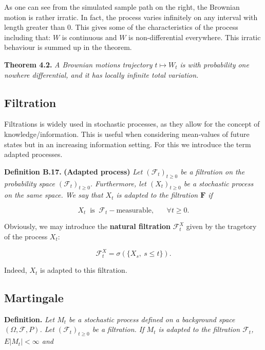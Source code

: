 \documentclass[
]{article}
\begin{document}
As one can see from the simulated sample path on the right, the Brownian
motion is rather irratic. In fact, the process varies infinitely on any
interval with length greater than 0. This gives some of the
characteristics of the process including that: \(W\) is continuous and
\(W\) is non-differential everywhere. This irratic behaviour is summed
up in the theorem.

\textbf{Theorem 4.2.} \emph{A Brownian motions trajectory
\(t\mapsto W_t\) is with probability one nowhere differential, and it
has locally infinite total variation.}

\hypertarget{filtration}{%
\subsection{Filtration}\label{filtration}}

Filtrations is widely used in stochastic processes, as they allow for
the concept of knowledge/information. This is useful when considering
mean-values of future states but in an increasing information setting.
For this we introduce the term adapted processes.

\textbf{Definition B.17.} \textbf{(Adapted process)} \emph{Let
\((\mathcal{F}_t)_{t\ge 0}\) be a filtration on the probability space
\((\mathcal{F}_t)_{t\ge 0}\). Furthermore, let \((X_t)_{t\ge 0}\) be a
stochastic process on the same space. We say that \(X_t\) is adapted to
the filtration \(\mathbf{F}\) if}

\[X_t\ \text{ is }\ \mathcal{F}_t-\text{measurable},\hspace{20pt}\forall t\ge 0.\]

Obviously, we may introduce the \textbf{natural filtration}
\(\mathcal{F}^X_t\) given by the tragetory of the process \(X_t\):

\[\mathcal{F}^X_t=\sigma(\{X_s,\ s\le t\}).\]

Indeed, \(X_t\) is adapted to this filtration.

\hypertarget{martingale}{%
\subsection{Martingale}\label{martingale}}

\textbf{Definition.} \emph{Let \(M_t\) be a stochastic process defined
on a background space \((\Omega,\mathcal{F},P)\). Let
\((\mathcal{F}_t)_{t\ge 0}\) be a filtration. If \(M_t\) is adapted to
the filtration \(\mathcal{F}_t\), \(E\vert M_t\vert <\infty\) and}
\end{document}
